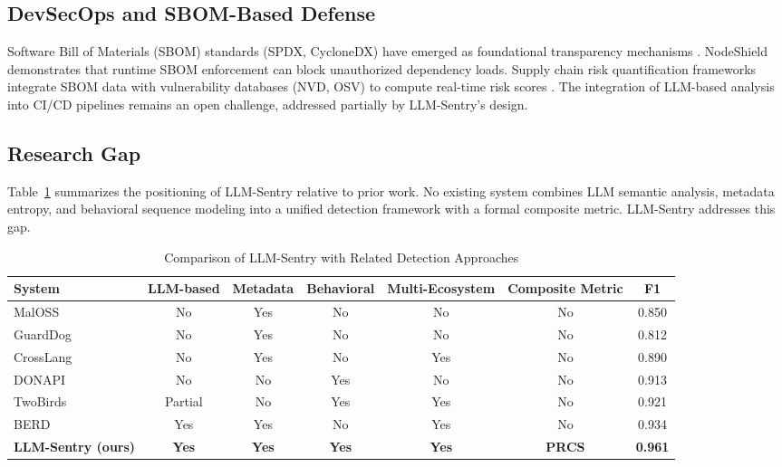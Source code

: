 \documentclass[conference]{IEEEtran}
\begin{document}
\subsection{DevSecOps and SBOM-Based Defense}

Software Bill of Materials (SBOM) standards (SPDX, CycloneDX) have emerged as foundational transparency mechanisms \cite{sbomdevsecops2024}. NodeShield \cite{nodeshield2025ccs} demonstrates that runtime SBOM enforcement can block unauthorized dependency loads. Supply chain risk quantification frameworks integrate SBOM data with vulnerability databases (NVD, OSV) to compute real-time risk scores \cite{scsrisk2024ase}. The integration of LLM-based analysis into CI/CD pipelines remains an open challenge, addressed partially by LLM-Sentry's design.

\subsection{Research Gap}

Table~\ref{tab:related} summarizes the positioning of LLM-Sentry relative to prior work. No existing system combines LLM semantic analysis, metadata entropy, and behavioral sequence modeling into a unified detection framework with a formal composite metric. LLM-Sentry addresses this gap.

\begin{table}[t]
\caption{Comparison of LLM-Sentry with Related Detection Approaches}
\label{tab:related}
\centering
\small
\begin{tabular}{lcccccc}
\toprule
\textbf{System} & \textbf{LLM-based} & \textbf{Metadata} & \textbf{Behavioral} & \textbf{Multi-Ecosystem} & \textbf{Composite Metric} & \textbf{F1} \\
\midrule
MalOSS \cite{sejfia2022practical}       & No      & Yes & No  & No  & No   & 0.850 \\
GuardDog \cite{guarddog2023msr}         & No      & Yes & No  & No  & No   & 0.812 \\
CrossLang \cite{crosslang2023acsac}     & No      & Yes & No  & Yes & No   & 0.890 \\
DONAPI \cite{donapi2024usenix}          & No      & No  & Yes & No  & No   & 0.913 \\
TwoBirds \cite{twobirdstone2024tosem}   & Partial & No  & Yes & Yes & No   & 0.921 \\
BERD \cite{berd2026www}                 & Yes     & Yes & No  & Yes & No   & 0.934 \\
\midrule
\textbf{LLM-Sentry (ours)}             & \textbf{Yes} & \textbf{Yes} & \textbf{Yes} & \textbf{Yes} & \textbf{PRCS} & \textbf{0.961} \\
\bottomrule
\end{tabular}
\end{table}
\end{document}
